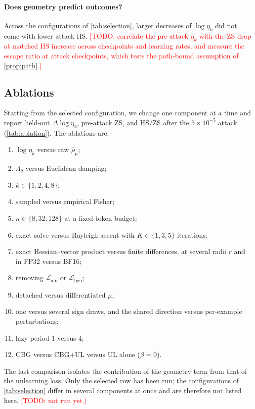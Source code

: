 \documentclass[11pt]{article}
\newcommand{\Laln}{\mathcal{L}_{\mathrm{aln}}}
\newcommand{\Lbgn}{\mathcal{L}_{\mathrm{bgn}}}
\newcommand{\rhohat}{\widehat{\rho}_{\mu}}
\newcommand{\Lam}{\Lambda_{\theta}}
\newcommand{\etak}{\eta_{k}}
\newcommand{\todo}[1]{\textcolor{red}{[TODO: #1]}}
\begin{document}
\paragraph{Does geometry predict outcomes?}
Across the configurations of \cref{tab:selection}, larger decreases of $\log\etak$ did not come with lower attack HS. \todo{correlate the pre-attack $\etak$ with the ZS drop at matched HS increase across checkpoints and learning rates, and measure the escape ratio at attack checkpoints, which tests the path-bound assumption of \cref{prop:path}.}

\subsection{Ablations}
\label{sec:ablation}

Starting from the selected configuration, we change one component at a time and report held-out $\Delta\log\etak$, pre-attack ZS, and HS/ZS after the $5\times10^{-5}$ attack (\cref{tab:ablation}). The ablations are:
\begin{enumerate}
  \item $\log\etak$ versus raw $\rhohat$;
  \item $\Lam$ versus Euclidean damping;
  \item $k\in\{1,2,4,8\}$;
  \item sampled versus empirical Fisher;
  \item $n\in\{8,32,128\}$ at a fixed token budget;
  \item exact solve versus Rayleigh ascent with $K\in\{1,3,5\}$ iterations;
  \item exact Hessian--vector product versus finite differences, at several radii $r$ and in FP32 versus BF16;
  \item removing $\Laln$ or $\Lbgn$;
  \item detached versus differentiated $\mu$;
  \item one versus several sign draws, and the shared direction versus per-example perturbations;
  \item lazy period $1$ versus $4$;
  \item CBG versus CBG+UL versus UL alone ($\beta=0$).
\end{enumerate}
The last comparison isolates the contribution of the geometry term from that of the unlearning loss. Only the selected row has been run; the configurations of \cref{tab:selection} differ in several components at once and are therefore not listed here. \todo{not run yet.}
\end{document}
